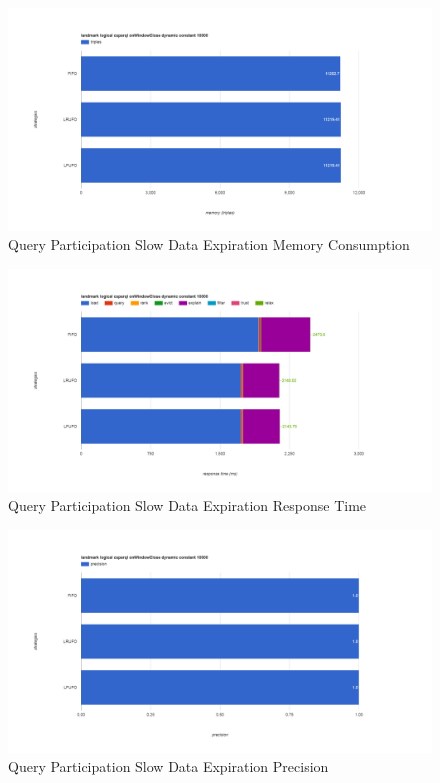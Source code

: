\begin{figure}[!htbp]
    \centering
    \includegraphics[width=\textwidth]{img/app3-qp-slow-m.png}
    \caption{Query Participation Slow Data Expiration Memory Consumption}
\end{figure}
\begin{figure}[!htbp]
    \centering
    \includegraphics[width=\textwidth]{img/app3-qp-slow-r.png}
    \caption{Query Participation Slow Data Expiration Response Time}
\end{figure}
\begin{figure}[!htbp]
    \centering
    \includegraphics[width=\textwidth]{img/app3-qp-slow-p.png}
    \caption{Query Participation Slow Data Expiration Precision}
\end{figure}
